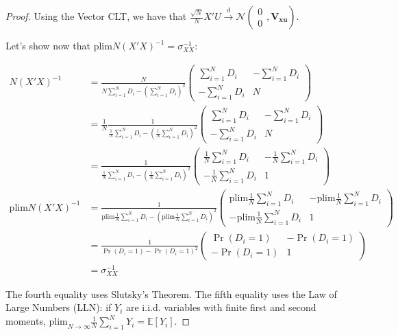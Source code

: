 \documentclass[
]{book}
\newcommand{\esp}[1]{\mathbb{E}[ #1 ]}
\newcommand{\plim}[1]{\text{plim}_{ #1 \rightarrow \infty}}
\newcommand{\plims}{\text{plim}}
\theoremstyle{definition}
\theoremstyle{definition}
\theoremstyle{definition}
\theoremstyle{definition}
\theoremstyle{remark}
\begin{document}
\begin{proof}
Using the Vector CLT, we have that \(\frac{\sqrt{N}}{N}X'U\stackrel{d}{\rightarrow}\mathcal{N}\left(\begin{array}{c} 0\\ 0\end{array},\mathbf{V_{xu}}\right)\).

Let's show now that \(\plims N(X'X)^{-1}=\sigma_{XX}^{-1}\):

\begin{align*}
N(X'X)^{-1} & = \frac{N}{N\sum_{i=1}^ND_i-\left(\sum_{i=1}^ND_i\right)^2}
                \left(\begin{array}{cc} \sum_{i=1}^ND_i & -\sum_{i=1}^ND_i \\ -\sum_{i=1}^ND_i & N \end{array}\right) \\
            & = \frac{1}{N}\frac{1}{\frac{1}{N}\sum_{i=1}^ND_i-\left(\frac{1}{N}\sum_{i=1}^ND_i\right)^2}
                \left(\begin{array}{cc} \sum_{i=1}^ND_i & -\sum_{i=1}^ND_i \\ -\sum_{i=1}^ND_i & N \end{array}\right)\\
            & = \frac{1}{\frac{1}{N}\sum_{i=1}^ND_i-\left(\frac{1}{N}\sum_{i=1}^ND_i\right)^2}
                \left(\begin{array}{cc} \frac{1}{N}\sum_{i=1}^ND_i & -\frac{1}{N}\sum_{i=1}^ND_i \\ -\frac{1}{N}\sum_{i=1}^ND_i & 1 \end{array}\right)\\
\plims N(X'X)^{-1} & = \frac{1}{\plims\frac{1}{N}\sum_{i=1}^ND_i-\left(\plims\frac{1}{N}\sum_{i=1}^ND_i\right)^2}
                \left(\begin{array}{cc} \plims\frac{1}{N}\sum_{i=1}^ND_i & -\plims\frac{1}{N}\sum_{i=1}^ND_i \\ -\plims\frac{1}{N}\sum_{i=1}^ND_i & 1 \end{array}\right)\\
                  & = \frac{1}{\Pr(D_i=1)-\Pr(D_i=1)^2}
                \left(\begin{array}{cc} \Pr(D_i=1) & -\Pr(D_i=1) \\ -\Pr(D_i=1) & 1 \end{array}\right)\\
                 & = \sigma_{XX}^{-1}
\end{align*}

The fourth equality uses Slutsky's Theorem.
The fifth equality uses the Law of Large Numbers (LLN): if \(Y_i\) are i.i.d. variables with finite first and second moments, \(\plim{N}\frac{1}{N}\sum_{i=1}^NY_i = \esp{Y_i}\).


\end{proof}
\end{document}
